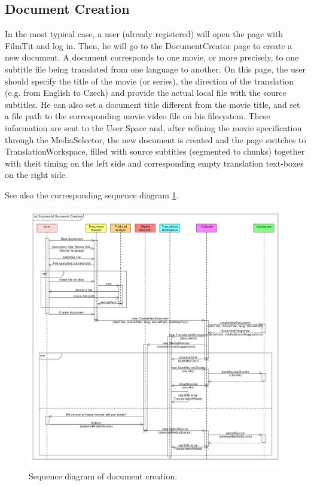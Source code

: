 
\subsection{Document Creation}

In the most typical case, a user (already registered) will open the page with FilmTit and log in. Then, he will go to the DocumentCreator page to create a new document. A document corresponds to one movie, or more precisely, to one subtitle file being translated from one language to another. On this page, the user should specify the title of the movie (or series), the direction of the translation (e.g. from English to Czech) and provide the actual local file with the source subtitles. He can also set a document title different from the movie title, and set a file path to the corresponding movie video file on his filesystem.
These information are sent to the User Space and, after refining the movie specification through the MediaSelector, the new document is created and the page switches to TranslationWorkspace, filled with source subtitles (segmented to chunks) together with theit timing on the left side and corresponding empty translation text-boxes on the right side.

See also the corresponding sequence diagram \ref{gui:sd:document_creation}.

\begin{figure}[h]
\begin{center}
\includegraphics[scale=0.40]{figures/document_creation_sequence_GUI.pdf}
\end{center}
\caption{Sequence diagram of document creation.}\label{gui:sd:document_creation}
\end{figure}

